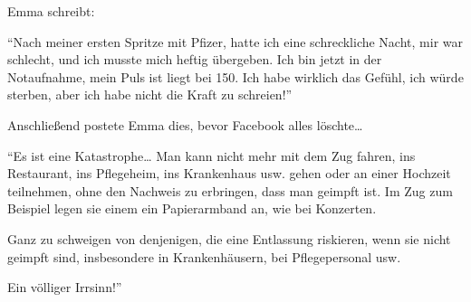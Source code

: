 Emma schreibt:

“Nach meiner ersten Spritze mit Pfizer, hatte ich eine schreckliche Nacht, mir
war schlecht, und ich musste mich heftig übergeben. Ich bin jetzt in der
Notaufnahme, mein Puls ist liegt bei 150. Ich habe wirklich das Gefühl, ich
würde sterben, aber ich habe nicht die Kraft zu schreien!”

Anschließend postete Emma dies, bevor Facebook alles löschte…

“Es ist eine Katastrophe… Man kann nicht mehr mit dem Zug fahren, ins
Restaurant, ins Pflegeheim, ins Krankenhaus usw. gehen oder an einer Hochzeit
teilnehmen, ohne den Nachweis zu erbringen, dass man geimpft ist. Im Zug zum
Beispiel legen sie einem ein Papierarmband an, wie bei Konzerten.

Ganz zu schweigen von denjenigen, die eine Entlassung riskieren, wenn sie nicht
geimpft sind, insbesondere in Krankenhäusern, bei Pflegepersonal usw.

Ein völliger Irrsinn!”

